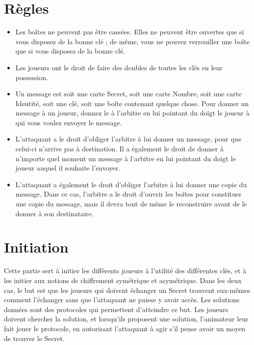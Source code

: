 \documentclass[a4paper,10pt]{article}
\begin{document}
\section{Règles}
\begin{itemize}
\item Les boîtes ne peuvent pas être cassées. Elles ne peuvent être ouvertes que si vous disposez de la bonne clé ; de même, vous ne pouvez verrouiller une boîte que si vous disposez de la bonne clé.
\item Les joueurs ont le droit de faire des doubles de toutes les clés en leur possession.
\item Un message est soit une carte Secret, soit une carte Nombre, soit une carte Identité, soit une clé, soit une boîte contenant quelque chose. Pour donner un message à un joueur, donnez le à l'arbitre en lui pointant du doigt le joueur à qui vous voulez envoyer le message.
\item L'attaquant a le droit d'obliger l'arbitre à lui donner un message, pour que celui-ci n'arrive pas à destination. Il a également le droit de donner à n'importe quel moment un message à l'arbitre en lui pointant du doigt le joueur auquel il souhaite l'envoyer. 
\item L'attaquant a également le droit d'obliger l'arbitre à lui donner une copie du message. Dans ce cas, l'arbitre a le droit d'ouvrir les boîtes pour constituer une copie du message, mais il devra tout de même le reconstruire avant de le donner à son destinataire.
\end{itemize}


\section{Initiation}
Cette partie sert à initier les différents joueurs à l'utilité des différentes clés, et à les initier aux notions de chiffrement symétrique et asymétrique. Dans les deux cas, le but est que les joueurs qui doivent échanger un Secret trouvent eux-mêmes comment l'échanger sans que l'attaquant ne puisse y avoir accès. Les solutions données sont des protocoles qui permettent d'atteindre ce but. Les joueurs doivent chercher la solution, et lorsqu'ils proposent une solution, l'animateur leur fait jouer le protocole, en autorisant l'attaquant à agir s'il pense avoir un moyen de trouver le Secret.
\end{document}
